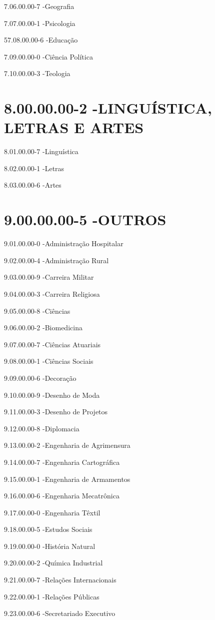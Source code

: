 7.06.00.00-7 -Geografia

7.07.00.00-1 -Psicologia

57.08.00.00-6 -Educação

7.09.00.00-0 -Ciência Política

7.10.00.00-3 -Teologia

\section*{8.00.00.00-2 -LINGUÍSTICA, LETRAS E ARTES}

8.01.00.00-7 -Linguística

8.02.00.00-1 -Letras

8.03.00.00-6 -Artes

\section*{9.00.00.00-5 -OUTROS}

9.01.00.00-0 -Administração Hospitalar

9.02.00.00-4 -Administração Rural

9.03.00.00-9 -Carreira Militar

9.04.00.00-3 -Carreira Religiosa

9.05.00.00-8 -Ciências

9.06.00.00-2 -Biomedicina

9.07.00.00-7 -Ciências Atuariais

9.08.00.00-1 -Ciências Sociais

9.09.00.00-6 -Decoração

9.10.00.00-9 -Desenho de Moda

9.11.00.00-3 -Desenho de Projetos

9.12.00.00-8 -Diplomacia

9.13.00.00-2 -Engenharia de Agrimensura

9.14.00.00-7 -Engenharia Cartográfica

9.15.00.00-1 -Engenharia de Armamentos

9.16.00.00-6 -Engenharia Mecatrônica

9.17.00.00-0 -Engenharia Têxtil

9.18.00.00-5 -Estudos Sociais

9.19.00.00-0 -História Natural

9.20.00.00-2 -Química Industrial

9.21.00.00-7 -Relações Internacionais

9.22.00.00-1 -Relações Públicas

9.23.00.00-6 -Secretariado Executivo